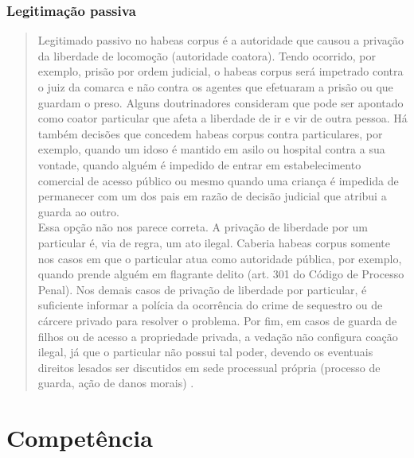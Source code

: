 \documentclass{article}
\begin{document}
\subsubsection{Legitimação passiva}

\begin{quote}
    Legitimado passivo no habeas corpus é a autoridade que causou a privação da liberdade de locomoção (autoridade coatora). Tendo ocorrido, por exemplo, prisão por ordem judicial, o habeas corpus será impetrado contra o juiz da comarca e não contra os agentes que efetuaram a prisão ou que guardam o preso. Alguns doutrinadores consideram que pode ser apontado como coator particular que afeta a liberdade de ir e vir de outra pessoa. Há também decisões que concedem habeas corpus contra particulares, por exemplo, quando um idoso é mantido em asilo ou hospital contra a sua vontade, quando alguém é impedido de entrar em estabelecimento comercial de acesso público ou mesmo quando uma criança é impedida de permanecer com um dos pais em razão de decisão judicial que atribui a guarda ao outro.\\
    Essa opção não nos parece correta. A privação de liberdade por um particular é, via de regra, um ato ilegal. Caberia habeas corpus somente nos casos em que o particular atua como autoridade pública, por exemplo, quando prende alguém em flagrante delito (art. 301 do Código de Processo Penal). Nos demais casos de privação de liberdade por particular, é suficiente informar a polícia da ocorrência do crime de sequestro ou de cárcere privado para resolver o problema. Por fim, em casos de guarda de filhos ou de acesso a propriedade privada, a vedação não configura coação ilegal, já que o particular não possui tal poder, devendo os eventuais direitos lesados ser discutidos em sede processual própria (processo de guarda, ação de danos morais) \cite[p. 403]{dimoulis_curso_2016}.
\end{quote}

\section{Competência}

\printbibliography
\end{document}
